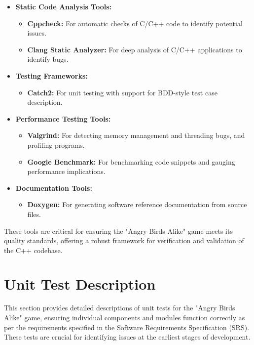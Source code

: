 \documentclass[12pt]{article}
\begin{document}
\begin{itemize}
    \item \textbf{Static Code Analysis Tools:}
        \begin{itemize}
            \item \textbf{Cppcheck:} For automatic checks of C/C++ code to identify potential issues.
            \item \textbf{Clang Static Analyzer:} For deep analysis of C/C++ applications to identify bugs.
        \end{itemize}
    \item \textbf{Testing Frameworks:}
        \begin{itemize}
            \item \textbf{Catch2:} For unit testing with support for BDD-style test case description.
        \end{itemize}
    \item \textbf{Performance Testing Tools:}
        \begin{itemize}
            \item \textbf{Valgrind:} For detecting memory management and threading bugs, and profiling programs.
            \item \textbf{Google Benchmark:} For benchmarking code snippets and gauging performance implications.
        \end{itemize}
    \item \textbf{Documentation Tools:}
        \begin{itemize}
            \item \textbf{Doxygen:} For generating software reference documentation from source files.
        \end{itemize}
\end{itemize}

These tools are critical for ensuring the "Angry Birds Alike" game meets its quality standards, offering a robust framework for verification and validation of the C++ codebase.

\section{Unit Test Description}

This section provides detailed descriptions of unit tests for the "Angry Birds Alike" game, ensuring individual components and modules function correctly as per the requirements specified in the Software Requirements Specification (SRS). These tests are crucial for identifying issues at the earliest stages of development.
\end{document}
